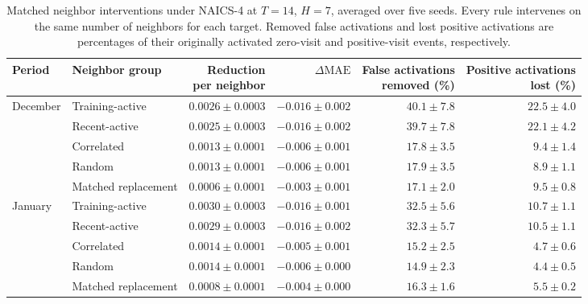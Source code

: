 \begin{table}[!htbp]
\centering
\begingroup
\singlespacing
\fontsize{9pt}{10.5pt}\selectfont
\setlength{\tabcolsep}{4pt}
\renewcommand{\arraystretch}{1.08}
\caption{Matched neighbor interventions under NAICS-4 at $T=14$, $H=7$, averaged over five seeds. Every rule intervenes on the same number of neighbors for each target. Removed false activations and lost positive activations are percentages of their originally activated zero-visit and positive-visit events, respectively.}
\label{tab:metric_targeted_perturbation_naics4}
\begin{adjustbox}{max width=\linewidth}
\begin{tabular}{llrrrr}
\toprule
Period & Neighbor group & \makecell{Reduction\\per neighbor} & $\Delta\mathrm{MAE}$ & \makecell{False activations\\removed (\%)} & \makecell{Positive activations\\lost (\%)} \\
\midrule
December & Training-active & $0.0026\pm 0.0003$ & $-0.016\pm 0.002$ & $40.1\pm 7.8$ & $22.5\pm 4.0$ \\
 & Recent-active & $0.0025\pm 0.0003$ & $-0.016\pm 0.002$ & $39.7\pm 7.8$ & $22.1\pm 4.2$ \\
 & Correlated & $0.0013\pm 0.0001$ & $-0.006\pm 0.001$ & $17.8\pm 3.5$ & $9.4\pm 1.4$ \\
 & Random & $0.0013\pm 0.0001$ & $-0.006\pm 0.001$ & $17.9\pm 3.5$ & $8.9\pm 1.1$ \\
 & Matched replacement & $0.0006\pm 0.0001$ & $-0.003\pm 0.001$ & $17.1\pm 2.0$ & $9.5\pm 0.8$ \\
\addlinespace[3pt]
January & Training-active & $0.0030\pm 0.0003$ & $-0.016\pm 0.001$ & $32.5\pm 5.6$ & $10.7\pm 1.1$ \\
 & Recent-active & $0.0029\pm 0.0003$ & $-0.016\pm 0.002$ & $32.3\pm 5.7$ & $10.5\pm 1.1$ \\
 & Correlated & $0.0014\pm 0.0001$ & $-0.005\pm 0.001$ & $15.2\pm 2.5$ & $4.7\pm 0.6$ \\
 & Random & $0.0014\pm 0.0001$ & $-0.006\pm 0.000$ & $14.9\pm 2.3$ & $4.4\pm 0.5$ \\
 & Matched replacement & $0.0008\pm 0.0001$ & $-0.004\pm 0.000$ & $16.3\pm 1.6$ & $5.5\pm 0.2$ \\
\bottomrule
\end{tabular}
\end{adjustbox}
\endgroup
\end{table}
